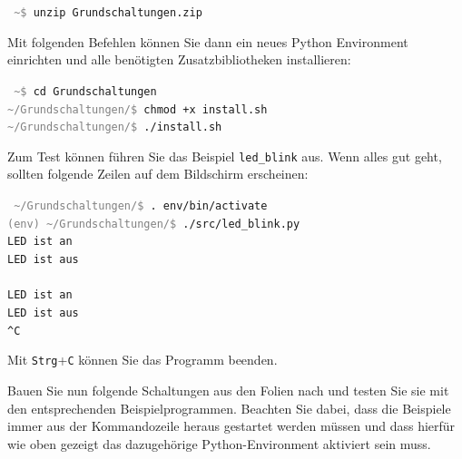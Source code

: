 \newcommand*{\CommandPrompt}[1]{\textcolor{gray}{#1}}

{
    \medskip
    \tt
    \CommandPrompt{\~{}\$} unzip Grundschaltungen.zip
    \medskip
}

Mit folgenden Befehlen können Sie dann ein neues Python Environment einrichten
und alle benötigten Zusatzbibliotheken installieren:

{
    \medskip
    \tt
    \CommandPrompt{\~{}\$} cd Grundschaltungen \\
    \CommandPrompt{\~{}/Grundschaltungen/\$} chmod +x install.sh \\
    \CommandPrompt{\~{}/Grundschaltungen/\$} ./install.sh
    \medskip
}

Zum Test können führen Sie das Beispiel \texttt{led\_blink} aus. Wenn alles gut
geht, sollten folgende Zeilen auf dem Bildschirm erscheinen:

{
    \medskip
    \tt
    \CommandPrompt{\~{}/Grundschaltungen/\$} . env/bin/activate \\
    \CommandPrompt{(env) \~{}/Grundschaltungen/\$} ./src/led\_blink.py \\
    LED ist an \\
    LED ist aus \\
    \\
    LED ist an \\
    LED ist aus \\
    \^{}C
    \medskip
}

Mit \texttt{Strg}+\texttt{C} können Sie das Programm beenden.

\bigskip
\teilaufgabe
Bauen Sie nun folgende Schaltungen aus den Folien nach und testen Sie sie mit
den entsprechenden Beispielprogrammen. Beachten Sie dabei, dass die Beispiele
immer aus der Kommandozeile heraus gestartet werden müssen und dass hierfür
wie oben gezeigt das dazugehörige Python-Environment aktiviert sein muss.

\bigskip

